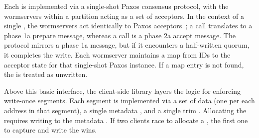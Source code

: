 Each \WOR{} is implemented via a single-shot Paxos consensus protocol, with the wormservers within a partition acting as a set of acceptors. In the context of a single \WOR{}, the wormservers act identically to Paxos acceptors~\cite{paxosmadesimple}; a \api{\prepare{}} call translates to a phase 1a prepare message, whereas a  call is a phase 2a accept message. The  protocol mirrors a phase 1a message, but if it encounters a half-written quorum, it completes the write. Each wormserver maintains a map from \WOR{} IDs to the acceptor state for that single-shot Paxos instance. If a map entry is not found, the \WOR{} is treated as unwritten.

Above this basic \WOR{} interface, the client-side library layers the logic for enforcing write-once segments. Each \WOS{} segment is implemented via a set of data \WORs{} (one per each address in that segment), a single metadata \WOR{}, and a single trim \WOR{}. Allocating the \WOS{} requires writing to the metadata \WOR{}. If two clients race to allocate a \WOS{}, the first one to capture and write the \WOR{} wins.


